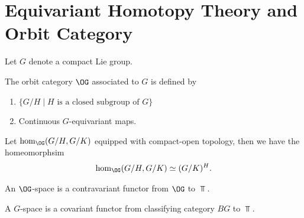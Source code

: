 
\section{Equivariant Homotopy Theory and Orbit Category}

Let $G$ denote a compact Lie group. 

\begin{definition}
    The orbit category $\OG$ associated to $G$ is defined by 
    \begin{enumerate}
        \item[Objects] $\{G/H\mid H\text{ is a closed subgroup of }G\}$
        \item[Morphsims] Continuous $G$-equivariant maps. 
    \end{enumerate}
\end{definition}

Let $\hom_{\OG}(G/H,G/K)$ equipped with compact-open topology, then we have the homeomorphsim 
\begin{align*}
    \hom_{\OG}(G/H,G/K) \simeq (G/K)^H.
\end{align*} 




\begin{definition}
    An $\OG$-space is a contravariant functor from $\OG$ to $\Top$.
\end{definition}

\begin{definition}
    A $G$-space is a covariant functor from classifying category $BG$ to $\Top$.
\end{definition}

\begin{theorem}
    
\end{theorem}





